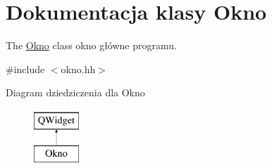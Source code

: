 \hypertarget{class_okno}{}\section{Dokumentacja klasy Okno}
\label{class_okno}


The \hyperlink{class_okno}{Okno} class okno główne programu.  




{\ttfamily \#include $<$okno.\+hh$>$}

Diagram dziedziczenia dla Okno\begin{figure}[H]
\begin{center}
\leavevmode
\includegraphics[height=2.000000cm]{class_okno}
\end{center}
\end{figure}

